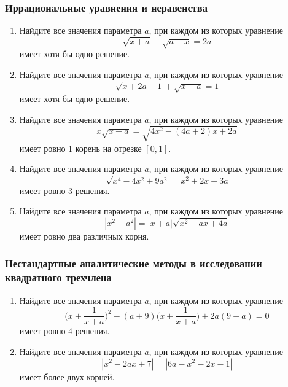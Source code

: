 \documentclass[12pt]{article}
\begin{document}
\subsubsection{Иррациональные уравнения и неравенства}
\begin{enumerate}[start=1,label={\itshape\bfseries \arabic*.}]
    \item Найдите все значения параметра $a$, при каждом из которых уравнение
    $$\sqrt{x + a} + \sqrt{a - x} = 2a$$
    имеет хотя бы одно решение.
    \item Найдите все значения параметра $a$, при каждом из которых уравнение
    $$\sqrt{x + 2a - 1} + \sqrt{x - a} = 1$$
    имеет хотя бы одно решение.
    \item Найдите все значения параметра $a$, при каждом из которых уравнение
    $$x\sqrt{x - a} = \sqrt{4x^2 - (4a + 2)x + 2a}$$
    имеет ровно 1 корень на отрезке $[0, 1]$.
    \item Найдите все значения параметра $a$, при каждом из которых уравнение $$\sqrt{x^4 - 4x^2 + 9a^2} = x^2 + 2x - 3a$$ имеет ровно 3 решения.
    \item Найдите все значения параметра $a$, при каждом из которых уравнение
    $$|x^2 - a^2| = |x + a|\sqrt{x^2 - ax + 4a}$$
    имеет ровно два различных корня.
\end{enumerate}
\subsubsection{Нестандартные аналитические методы в исследовании квадратного трехчлена}
\begin{enumerate}[start=1,label={\itshape\bfseries \arabic*.}]
    \item Найдите все значения параметра $a$, при каждом из которых уравнение
    $$\bigg( x + \frac{1}{x + a} \bigg)^2 - (a + 9)\bigg(x + \frac{1}{x + a} \bigg) + 2a(9 - a) = 0$$
    имеет ровно 4 решения.
    \item Найдите все значения параметра $a$, при каждом из которых уравнение
    $$|x^2 - 2ax + 7| = |6a - x^2 - 2x - 1|$$
    имеет более двух корней.
\end{enumerate}
\end{document}
